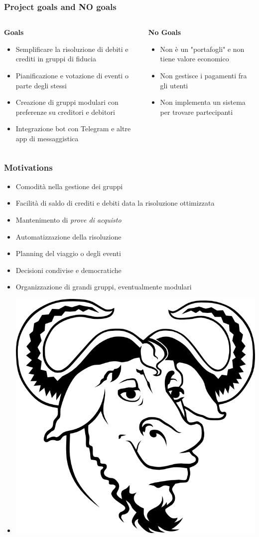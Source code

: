 \documentclass[11pt]{beamer}
\begin{document}
	\begin{frame}
		\frametitle{Project goals and NO goals}
		
		\begin{columns}
			\begin{column}{.45\linewidth}
				\begin{center}
					\textbf{Goals}
				\end{center}
				\begin{itemize}
					\item Semplificare la risoluzione di debiti e crediti in gruppi di fiducia
					\item Pianificazione e votazione di eventi o parte degli stessi
					\item Creazione di gruppi modulari con preferenze su creditori e debitori
					\item Integrazione bot con Telegram e altre app di messaggistica
				\end{itemize}
			\end{column}
			\begin{column}{.45\linewidth}
				\begin{center}
					\textbf{No Goals}
				\end{center}
				\begin{itemize}
					\item Non è un "portafogli" e non tiene valore economico
					\item Non gestisce i pagamenti fra gli utenti%
					\item Non implementa un sistema per trovare partecipanti
				\end{itemize}
			\end{column}
		\end{columns}
	\end{frame}

	\begin{frame}
		\frametitle{Motivations}
		
		\begin{itemize}
			\item Comodità nella gestione dei gruppi
			\item Facilità di saldo di crediti e debiti data la risoluzione ottimizzata
			\item Mantenimento di \textit{prove di acquisto}
			\item Automatizzazione della risoluzione
			\item Planning del viaggio o degli eventi
			\item Decisioni condivise e democratiche
			\item Organizzazione di grandi gruppi, eventualmente modulari
			\item[] \includegraphics[width=.1\linewidth]{img/gnu.png}
		\end{itemize}
	\end{frame}
\end{document}
